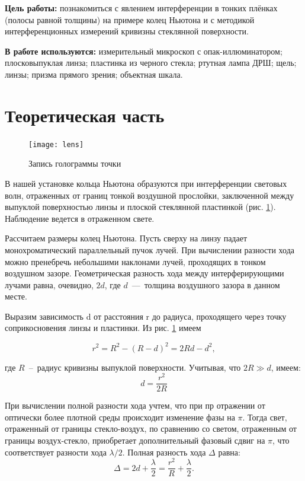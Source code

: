 \documentclass{letask}
\begin{document}


\textbf{Цель работы:}
познакомиться с явлением интерференции в тонких плёнках (полосы равной толщины) на примере колец Ньютона и с методикой интерференционных измерений кривизны стеклянной поверхности.

\textbf{В работе используются:} измерительный микроскоп с опак-иллюминатором; плосковыпуклая линза; пластинка из черного стекла; ртутная лампа ДРШ; щель; линзы; призма прямого зрения; объектная шкала.

\section{Теоретическая часть}

\begin{figure}
\label{img: lens}
\texttt{[image: lens]}
\caption{Запись голограммы точки}
\end{figure}
В нашей установке кольца Ньютона образуются при интерференции световых волн, отраженных от границ тонкой воздушной прослойки, заключенной между выпуклой поверхностью линзы и плоской стеклянной пластинкой (рис. \ref{img: lens}). Наблюдение ведется в отраженном свете.

Рассчитаем размеры колец Ньютона. Пусть сверху на линзу падает монохроматический параллельный пучок лучей. При вычислении разности хода можно пренебречь небольшими наклонами лучей, проходящих в тонком воздушном зазоре. Геометрическая разность хода между интерферирующими лучами равна, очевидно, $2d$, где $d$~—~толщина воздушного зазора в данном месте.

Выразим зависимость d от расстояния r до радиуса, проходящего через точку соприкосновения линзы и пластинки. Из рис. \ref{img: lens} имеем

\[
r^2 = R^2 - (R-d)^2 = 2Rd - d^2,
\]

где $R$~--~радиус кривизны выпуклой поверхности. Учитывая, что $2R \gg d$, имеем:
\[ d= \dfrac{r^2}{2R} \]

При вычислении полной разности хода учтем, что при пр отражении от оптически более плотной среды происходит изменение фазы на $\pi$. Тогда свет, отраженный от границы стекло-воздух, по сравнению со светом, отраженным от границы воздух-стекло, приобретает дополнительный фазовый сдвиг на $\pi$, что соответствует разности хода $\lambda / 2$. Полная разность хода $\Delta$ равна:
\begin{equation}
\label{eq:Delta}
\Delta = 2d + \dfrac{\lambda}{2} = \dfrac{r^2}{R} + \dfrac{\lambda}{2}.
\end{equation}
\end{document}
